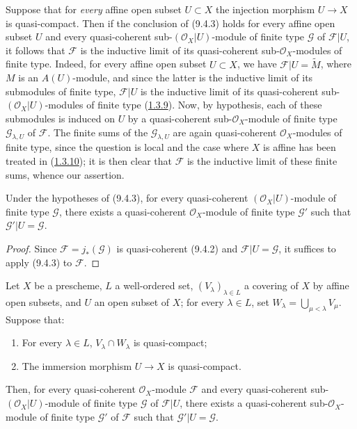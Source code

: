 \begin{remark}[9.4.4]
\label{I.9.4.4}
Suppose that for \emph{every} affine open subset $U\subset X$ the injection
morphism $U\to X$ is quasi-compact. Then if the conclusion of (9.4.3)
holds for every affine open subset $U$ and every quasi-coherent
sub-$(\mathscr{O}_X|U)$-module of finite type $\mathscr{G}$ of
$\mathscr{F}|U$,
it follows that $\mathscr{F}$ is the inductive limit of its quasi-coherent
sub-$\mathscr{O}_X$-modules of finite type. Indeed, for every affine open
subset $U\subset X$, we have $\mathscr{F}|U=\widetilde{M}$, where $M$ is an
$A(U)$-module, and since the latter is the inductive limit of its
submodules of finite type, $\mathscr{F}|U$ is the inductive limit of its
quasi-coherent sub-$(\mathscr{O}_X|U)$-modules of finite type
(\hyperref[I.1.3.9]{1.3.9}). Now, by hypothesis, each of these
submodules is induced on $U$ by a quasi-coherent sub-$\mathscr{O}_X$-module
of finite type $\mathscr{G}_{\lambda,U}$ of $\mathscr{F}$. The finite sums
of the $\mathscr{G}_{\lambda,U}$ are again quasi-coherent
$\mathscr{O}_X$-modules of finite type, since the question is local and the
case where $X$ is affine has been treated in
(\hyperref[I.1.3.10]{1.3.10}); it is then clear that $\mathscr{F}$ is the
inductive limit of these finite sums, whence our assertion.
\end{remark}

\begin{corollary}[9.4.5]
\label{I.9.4.5}
Under the hypotheses of (9.4.3), for every quasi-coherent
$(\mathscr{O}_X|U)$-module of finite type $\mathscr{G}$, there exists a
quasi-coherent $\mathscr{O}_X$-module of finite type $\mathscr{G}'$ such
that $\mathscr{G}'|U=\mathscr{G}$.
\end{corollary}

\begin{proof}
Since $\mathscr{F}=j_*(\mathscr{G})$ is quasi-coherent (9.4.2) and
$\mathscr{F}|U=\mathscr{G}$, it suffices to apply (9.4.3) to $\mathscr{F}$.
\end{proof}

\begin{lemma}[9.4.6]
\label{I.9.4.6}
Let $X$ be a prescheme, $L$ a well-ordered set,
$(V_\lambda)_{\lambda\in L}$ a covering of $X$ by affine open subsets, and
$U$ an open subset of $X$; for every $\lambda\in L$, set
$W_\lambda=\bigcup_{\mu<\lambda}V_\mu$. Suppose that:
\begin{enumerate}
  \item[1\textsuperscript{o}] For every $\lambda\in L$,
    $V_\lambda\cap W_\lambda$ is quasi-compact;
  \item[2\textsuperscript{o}] The immersion morphism $U\to X$ is
    quasi-compact.
\end{enumerate}
Then, for every quasi-coherent $\mathscr{O}_X$-module $\mathscr{F}$ and every
quasi-coherent sub-$(\mathscr{O}_X|U)$-module of finite type $\mathscr{G}$ of
$\mathscr{F}|U$, there exists a quasi-coherent sub-$\mathscr{O}_X$-module of
finite type $\mathscr{G}'$ of $\mathscr{F}$ such that
$\mathscr{G}'|U=\mathscr{G}$.
\end{lemma}

